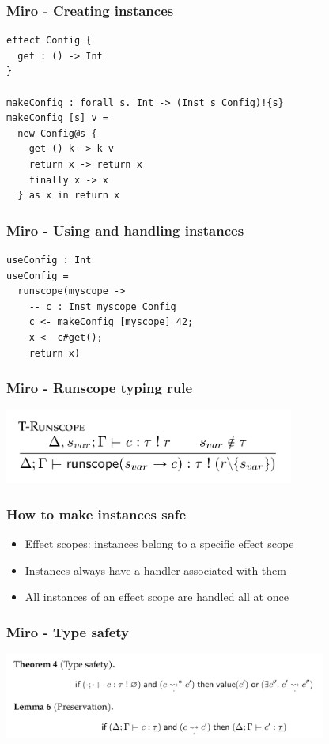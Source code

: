 \documentclass{beamer}
\begin{document}
\begin{frame}[fragile]\frametitle{Miro - Creating instances}
\begin{example}
\begin{verbatim}
effect Config {
  get : () -> Int
}

makeConfig : forall s. Int -> (Inst s Config)!{s}
makeConfig [s] v =
  new Config@s {
    get () k -> k v
    return x -> return x
    finally x -> x
  } as x in return x
\end{verbatim}
\end{example}
\end{frame}

\begin{frame}[fragile]\frametitle{Miro - Using and handling instances}
\begin{example}
\begin{verbatim}
useConfig : Int
useConfig =
  runscope(myscope ->
    -- c : Inst myscope Config
    c <- makeConfig [myscope] 42;
    x <- c#get();
    return x)
\end{verbatim}
\end{example}
\end{frame}

\begin{frame}[fragile]\frametitle{Miro - Runscope typing rule}
\begin{center}
\includegraphics[width=270pt]{images/typing-rule.png}
\end{center}
\end{frame}

\begin{frame}[fragile]\frametitle{How to make instances safe}
\begin{itemize}
\item Effect scopes: instances belong to a specific effect scope
\item Instances always have a handler associated with them
\item All instances of an effect scope are handled all at once
\end{itemize}
\end{frame}

\begin{frame}[fragile]\frametitle{Miro - Type safety}
\begin{center}
\includegraphics[width=300pt]{images/type-safety.png}
\end{center}
\end{frame}
\end{document}
